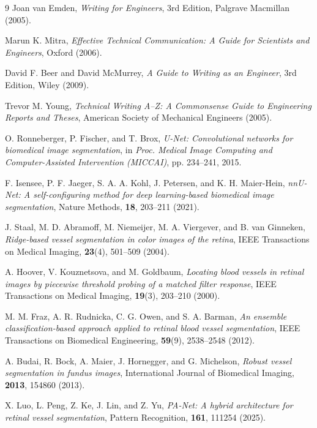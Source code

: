 \documentclass[a4paper,12pt]{article}
\begin{document}
\clearpage %
\begin{thebibliography}{9}
Joan van Emden,
\textit{Writing for Engineers},
3rd Edition,
Palgrave Macmillan 
(2005).

Marun K. Mitra,
\textit{Effective Technical Communication: A Guide for Scientists and Engineers},
Oxford
(2006).

David F. Beer and David McMurrey,
\textit{A Guide to Writing as an Engineer},
3rd Edition,
Wiley
(2009).

Trevor M. Young,
\textit{Technical Writing A--Z: A Commonsense Guide to Engineering Reports and Theses},
American Society of Mechanical Engineers
(2005).

O. Ronneberger, P. Fischer, and T. Brox,
\textit{U-Net: Convolutional networks for biomedical image segmentation},
in \textit{Proc. Medical Image Computing and Computer-Assisted Intervention (MICCAI)},
pp. 234--241,
2015.

F. Isensee, P. F. Jaeger, S. A. A. Kohl, J. Petersen, and K. H. Maier-Hein,
\textit{nnU-Net: A self-configuring method for deep learning-based biomedical image segmentation},
Nature Methods,
\textbf{18},
203--211
(2021).

J. Staal, M. D. Abramoff, M. Niemeijer, M. A. Viergever, and B. van Ginneken,
\textit{Ridge-based vessel segmentation in color images of the retina},
IEEE Transactions on Medical Imaging,
\textbf{23}(4),
501--509
(2004).

A. Hoover, V. Kouznetsova, and M. Goldbaum,
\textit{Locating blood vessels in retinal images by piecewise threshold probing of a matched filter response},
IEEE Transactions on Medical Imaging,
\textbf{19}(3),
203--210
(2000).

M. M. Fraz, A. R. Rudnicka, C. G. Owen, and S. A. Barman,
\textit{An ensemble classification-based approach applied to retinal blood vessel segmentation},
IEEE Transactions on Biomedical Engineering,
\textbf{59}(9),
2538--2548
(2012).

A. Budai, R. Bock, A. Maier, J. Hornegger, and G. Michelson,
\textit{Robust vessel segmentation in fundus images},
International Journal of Biomedical Imaging,
\textbf{2013},
154860
(2013).

X. Luo, L. Peng, Z. Ke, J. Lin, and Z. Yu,
\textit{PA-Net: A hybrid architecture for retinal vessel segmentation},
Pattern Recognition,
\textbf{161},
111254
(2025).


\end{thebibliography}
\end{document}
